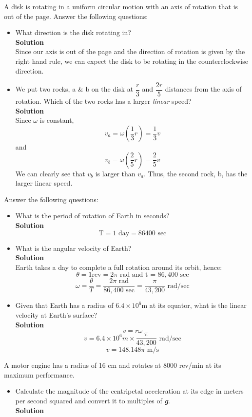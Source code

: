 \documentclass[9pt,addpoints]{exam}
\begin{document}
\begin{questions}
		\question A disk is rotating in a uniform circular motion with an axis of rotation that is out of the page. Answer the following questions:
		\begin{itemize}
			\item What direction is the disk rotating in?
			\\ \textbf{Solution} \\
			Since our axis is out of the page and the direction of rotation is given by the right hand rule, we can expect the disk to be rotating in the counterclockwise direction.
			\item We put two rocks, a \& b on the disk at $\dfrac{r}{3}$ and $\dfrac{2r}{5}$ distances from the axis of rotation. Which of the two rocks has a larger \textit{linear} speed? \\ \textbf{Solution} \\
			Since $\omega$ is constant,
			$$v_a=\omega(\frac{1}{3}r)=\frac{1}{3}v$$ and 
			$$v_b=\omega(\frac{2}{5}r)=\frac{2}{5}v$$
			We can clearly see that $v_b$ is larger than $v_a$. Thus, the second rock, b, has the larger linear speed.
		\end{itemize}
		\question Answer the following questions:
		\begin{itemize}
			\item What is the period of rotation of Earth in seconds? \\ \textbf{Solution} \\
			$$\text{T}= 1\text{ day}=86400\text{ sec}$$
			\item What is the angular velocity of Earth? \\ \textbf{Solution} \\
			Earth takes a day to complete a full rotation around its orbit, hence:
			$$\theta=1 \text{rev}=2\pi\text{ rad  and t = }86,400\text{ sec}$$
			$$\omega=\dfrac{\theta}{T}=\dfrac{2\pi\text{ rad}}{86,400\text{ sec}}=\frac{\pi}{43,200}\text{ rad/sec}$$
			\item Given that Earth has a radius of  $6.4\times10^6$m at its equator, what is the linear velocity at Earth's surface? \\ \textbf{Solution} \\
			$$v=r\omega$$
			$$v=6.4\times10^6m\times\frac{\pi}{43,200}\text{ rad/sec}$$
			$$v=148.148\pi\text{ m/s}$$
		\end{itemize}
		\question A motor engine has a radius of 16 cm and rotates at 8000 rev/min at its maximum performance.
		\begin{itemize}
			\item Calculate the magnitude of the centripetal acceleration at its edge in meters per second squared and convert it to multiples of \textbf{\textit{g}}. \\ \textbf{Solution} \\

\end{itemize}
\end{questions}
\end{document}
